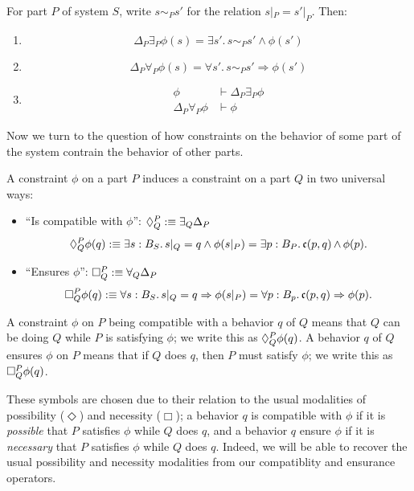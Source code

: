 \begin{claim}\label{Thing:lem:Global.Modality.Props}
For part $P$ of system $S$, write $s \sim_P s'$ for the relation $s|_P = s'|_P$. Then:
\begin{enumerate}
    \item $$\Delta_P \exists_P \phi(s) = \exists s'.\, s\sim_P s' \wedge \phi(s')$$
    \item $$\Delta_P \forall_P \phi(s) = \forall s'.\, s \sim_P s' \Rightarrow \phi(s')$$
    \item \begin{align*}
        \phi &\vdash \Delta_P \exists_P \phi\\
        \Delta_P \forall_P \phi &\vdash \phi 
    \end{align*}
\end{enumerate}
\end{claim}

Now we turn to the question of how constraints on the behavior of some part of the system contrain the behavior of other parts. 

     \begin{defn}
        A constraint $\phi$ on a part $P$ induces a constraint on a part $Q$ in two universal ways:
        \begin{itemize}
            \item ``Is compatible with $\phi$'': $\compat{P}{Q} :\equiv \exists_Q \Delta_P$
                $$\compat{P}{Q} \phi(q) :\equiv  \exists s : B_S.\, s|_Q = q \wedge \phi(s|_P) = \exists p : B_P.\, \mathfrak{c}(p, q) \meet \phi(p).$$
            \item ``Ensures $\phi$'': $\ensure{P}{Q} :\equiv \forall_Q  \Delta_P$
                $$\ensure{P}{Q} \phi(q) :\equiv \forall s : B_S.\, s|_Q = q \Rightarrow \phi(s|_P) = \forall p : B_p.\, \mathfrak{c}(p, q) \Rightarrow \phi(p).$$
        \end{itemize} 
    \end{defn}
    
    A constraint $\phi$ on $P$ being compatible with a behavior $q$ of $Q$ means that $Q$ can be doing $Q$ while $P$ is satisfying $\phi$; we write this as $\compat{P}{Q}\phi(q)$. A behavior $q$ of $Q$ ensures $\phi$ on $P$ means that if $Q$ does $q$, then $P$ must satisfy $\phi$; we write this as $\ensure{P}{Q}\phi(q)$.
    
    These symbols are chosen due to their relation to the usual modalities of possibility ($\Diamond$) and necessity ($\Box$); a behavior $q$ is compatible with $\phi$ if it is \emph{possible} that $P$ satisfies $\phi$ while $Q$ does $q$, and a behavior $q$ ensure $\phi$ if it is \emph{necessary} that $P$ satisfies $\phi$ while $Q$ does $q$. Indeed, we will be able to recover the usual possibility and necessity modalities from our compatiblity and ensurance operators.
    
